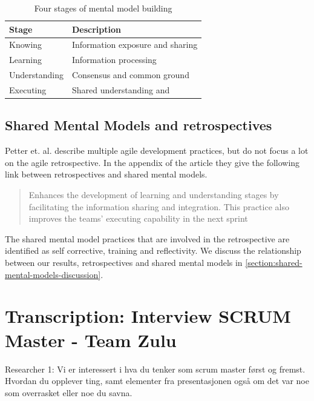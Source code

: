 \begin{table}[!h]
	\begin{centering}
	\caption{Four stages of mental model building}
	\label{table:stages-mental-model}
	\begin{tabular}{l | p{}}

	\hline
	Stage & Description \\
	\hline
	Knowing &  Information exposure and sharing\\
	Learning & Information processing \\
	Understanding & Consensus and common ground \\
	Executing & Shared understanding and  \\
	\hline
	
\end{tabular}
\end{centering}
\end{table}

	
\section{Shared Mental Models and retrospectives}

Petter et. al. \cite{Petter2013} describe multiple agile development practices, but do not focus a lot on the agile retrospective. In the appendix of the article they give the following link between retrospectives and shared mental models.

\begin{quote}
Enhances the development of learning and understanding stages by facilitating the information sharing and integration. This practice also improves the teams’ executing capability in the next sprint
\end{quote}

The shared mental model practices that are involved in the retrospective are identified as self corrective, training and reflectivity. We discuss the relationship between our results, retrospectives and shared mental models in \autoref{section:shared-mental-models-discussion}.

\chapter{Transcription: Interview SCRUM Master - Team Zulu}
Researcher 1: Vi er interessert i hva du tenker som scrum master først og fremst. Hvordan du opplever ting, samt elementer fra presentasjonen også om det var noe som overrasket eller noe du savna.

